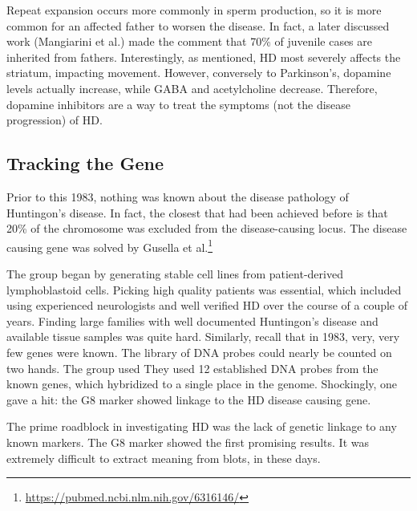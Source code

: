 Repeat expansion occurs more commonly in sperm production, so it is more common for an affected father to worsen the disease. In fact, a later discussed work (Mangiarini et al.) made the comment that 70\% of juvenile cases are inherited from fathers. Interestingly, as mentioned, HD most severely affects the striatum, impacting movement. However, conversely to Parkinson's, dopamine levels actually increase, while GABA and acetylcholine decrease. Therefore, dopamine inhibitors are a way to treat the symptoms (not the disease progression) of HD. 


\subsection*{Tracking the Gene}

Prior to this 1983, nothing was known about the disease pathology of Huntingon's disease. In fact, the closest that had been achieved before is that 20\% of the chromosome was excluded from the disease-causing locus. The disease causing gene was solved by Gusella et al.\footnote{\url{https://pubmed.ncbi.nlm.nih.gov/6316146/}}\newline

The group began by generating stable cell lines from patient-derived lymphoblastoid cells. Picking high quality patients was essential, which included using experienced neurologists and well verified HD over the course of a couple of years. Finding large families with well documented Huntingon's disease and available tissue samples was quite hard. Similarly, recall that in 1983, very, very few genes were known. The library of DNA probes could nearly be counted on two hands. The group used They used 12 established DNA probes from the known genes, which hybridized to a single place in the genome. Shockingly, one gave a hit: the G8 marker showed linkage to the HD disease causing gene.\newline

The prime roadblock in investigating HD was the lack of genetic linkage to any known markers. The G8 marker showed the first promising results. It was extremely difficult to extract meaning from blots, in these days.\newline

